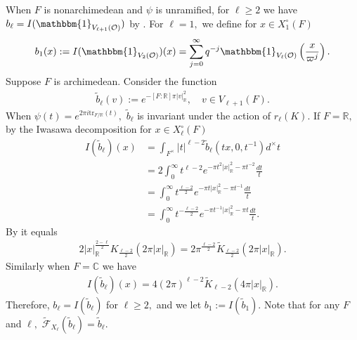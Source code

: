 \documentclass[11pt,a4paper,reqno]{amsart}
\theoremstyle{remark}
\numberwithin{equation}{section}
\newcommand{\OO}{\mathcal{O}}
\newcommand{\CC}{\mathbb{C}}
\newcommand{\RR}{\mathbb{R}}
\theoremstyle{definition}
\numberwithin{equation}{section}
\newcommand{\one}{\mathbbm{1}}
\begin{document}
When $F$ is nonarchimedean and $\psi$ is unramified, for $\ell \geq 2$ we have $b_{\ell}=I(\one_{V_{\ell+1}(\OO)})$ by \cite[Lemma 3.8]{Getz:Quad}. For $\ell=1,$ we define for $x\in X_1^\circ(F)$
\begin{align}\label{eq:basicagree}
    b_1(x):=I(\one_{V_{2}(\OO)})(x)=\sum_{j=0}^\infty q^{-j}\one_{V_\ell(\OO)}\left(\frac{x}{\varpi^j} \right).
\end{align}
Suppose $F$ is archimedean.  Consider the function 
\begin{align*}
    \tilde{b}_{\ell}(v):=e^{-[F:\RR]\pi |v|_\RR^2},\quad v\in V_{\ell+1}(F).
\end{align*}
 When $\psi(t)=e^{2\pi i\mathrm{tr}_{F/\RR}(t)},$ $\tilde{b}_\ell$ is invariant under the action of $r_\ell(K)$. If $F=\RR,$ by the Iwasawa decomposition for $x\in X_\ell^\circ(F)$
\begin{align*}
    I(\tilde{b}_\ell)(x)&=\int_{F^\times} |t|^{\ell-2}\tilde{b}_\ell(tx,0,t^{-1})d^\times t\\
    &=2\int_{0}^\infty t^{\ell-2}e^{-\pi t^2|x|_\RR^2-\pi t^{-2}}\frac{dt}{t}\\
    &=\int_{0}^\infty t^{\frac{\ell-2}{2}}e^{-\pi t|x|_\RR^2-\pi t^{-1}}\frac{dt}{t}\\
    &=\int_{0}^\infty t^{-\frac{\ell-2}{2}}e^{-\pi t^{-1}|x|_\RR^2-\pi t}\frac{dt}{t}.
\end{align*}
By \cite[\S 7.12 (23)]{Highertrans:II} it equals
\begin{align*}
    2|x|_\RR^{\frac{2-\ell}{2}}K_{\frac{\ell-2}{2}}( 2\pi |x|_\RR)=2\pi^{\frac{\ell-2}{2}}\widetilde{K}_{\frac{\ell-2}{2}}(2\pi |x|_\RR).
\end{align*}
Similarly when $F=\CC$ we have
\begin{align*}
  I(\tilde{b}_\ell)(x)=4(2\pi)^{\ell-2}\widetilde{K}_{\ell-2}(4\pi |x|_\RR).
\end{align*}
Therefore, $b_\ell=I(\tilde{b}_\ell)$ for $\ell\ge 2,$ and we let $b_1:=I(\tilde{b}_1).$ Note that for any $F$ and $\ell,$ $\widetilde{\mathcal{F}}_{X_\ell}(\tilde{b}_\ell)=\tilde{b}_\ell.$
\end{document}
